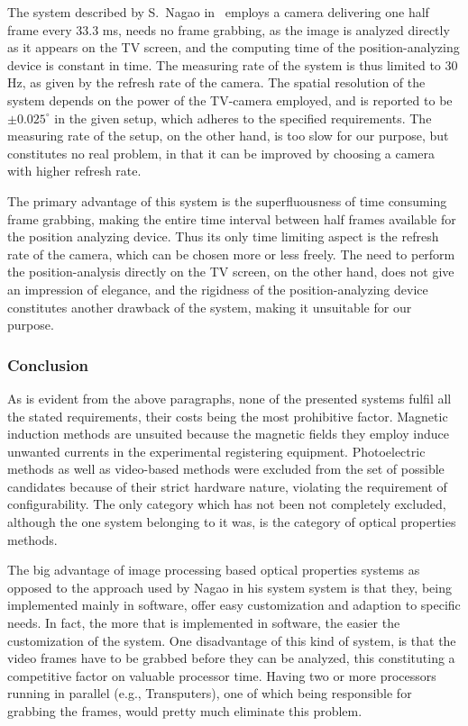 The system described by S.\ Nagao in~\cite{tv} employs a camera
delivering one half frame every 33.3 ms, needs no frame grabbing, as
the image is analyzed directly as it appears on the TV screen, and the
computing time of the position-analyzing device is constant in time.
The measuring rate of the system is thus limited to 30 Hz, as given by
the refresh rate of the camera.  The spatial resolution of the system
depends on the power of the TV-camera employed, and is reported to be
$\pm 0.025^{\circ}$ in the given setup, which adheres to the specified
requirements.  The measuring rate of the setup, on the other hand, is
too slow for our purpose, but constitutes no real problem, in that it
can be improved by choosing a camera with higher refresh rate.

The primary advantage of this system is the superfluousness of time
consuming frame grabbing, making the entire time interval between half
frames available for the position analyzing device.  Thus its only
time limiting aspect is the refresh rate of the camera, which can be
chosen more or less freely.  The need to perform the position-analysis
directly on the TV screen, on the other hand, does not give an
impression of elegance, and the rigidness of the position-analyzing
device constitutes another drawback of the system, making it
unsuitable for our purpose.

\subsubsection{Conclusion}

As is evident from the above paragraphs, none of the presented systems
fulfil all the stated requirements, their costs being the most
prohibitive factor.  Magnetic induction methods are unsuited because
the magnetic fields they employ induce unwanted currents in the
experimental registering equipment.  Photoelectric methods as well as
video-based methods were excluded from the set of possible candidates
because of their strict hardware nature, violating the requirement of
configurability.  The only category which has not been not completely
excluded, although the one system belonging to it was, is the category
of optical properties methods.

The big advantage of image processing based optical properties systems
as opposed to the approach used by Nagao in his system system is that
they, being implemented mainly in software, offer easy customization
and adaption to specific needs.  In fact, the more that is implemented
in software, the easier the customization of the system.  One
disadvantage of this kind of system, is that the video frames have to
be grabbed before they can be analyzed, this constituting a
competitive factor on valuable processor time.  Having two or more
processors running in parallel (e.g., Transputers), one of which being
responsible for grabbing the frames, would pretty much eliminate this
problem.

